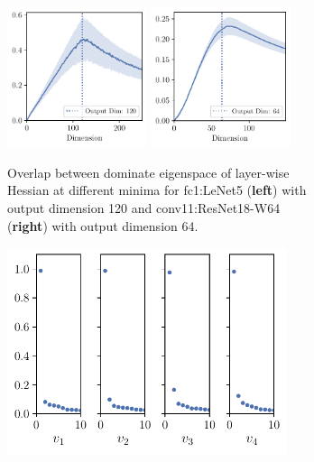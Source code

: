 \begin{figure}[th]
\vspace{-6pt}
    \centering
\captionsetup[sub]{format=subcaptionformat}
    \begin{subfigure}[b]{0.58\textwidth}
        \centering
        \captionsetup{justification=centering}
        \includegraphics[width=0.45\textwidth]{Figures/SubspaceOverlap/NLeNet5_multi_hyperparam/DimOverlap_CIFAR10_LeNet5_normnew_fixlr0.001_X_LeNet5_normnew_fixlr0.01_X_LeNet5_normnew_fixlr0.01_momentum_fc1.pdf}
        \includegraphics[width=0.45\textwidth]{Figures/SubspaceOverlap/ResNets/DimOverlap_CIFAR100_Resnet18W64New_nobn_fixlr0.01_layer3.0.conv2.pdf}
        \caption{Overlap between dominate eigenspace of layer-wise Hessian at different minima for fc1:LeNet5 (\textbf{left}) with output dimension 120 and conv11:ResNet18-W64 (\textbf{right}) with output dimension 64.}
        \label{fig:intro_overlap}
    \end{subfigure}%
    \begin{subfigure}[b]{0.38\textwidth}
        \centering
        \captionsetup{justification=centering}
        \includegraphics[width=0.9\textwidth]{Figures/Eigenvec_single/Top_Eigenvector_sigs_CIFAR10_Exp1_LeNet5_fixlr0.01R1_E-1fc1.pdf}

\end{subfigure}
\end{figure}
